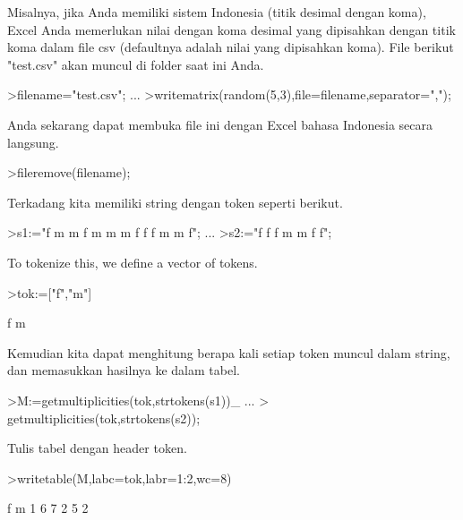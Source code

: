 \documentclass[a4paper,10pt]{article}
\begin{document}
\begin{eulernotebook}
\begin{eulercomment}
\begin{eulercomment}
\begin{eulercomment}
Misalnya, jika Anda memiliki sistem Indonesia (titik desimal dengan
koma), Excel Anda memerlukan nilai dengan koma desimal yang dipisahkan
dengan titik koma dalam file csv (defaultnya adalah nilai yang
dipisahkan koma). File berikut "test.csv" akan muncul di folder saat
ini Anda.
\end{eulercomment}
\begin{eulerprompt}
>filename="test.csv"; ...
>writematrix(random(5,3),file=filename,separator=",");
\end{eulerprompt}
\begin{eulercomment}
Anda sekarang dapat membuka file ini dengan Excel bahasa Indonesia
secara langsung.
\end{eulercomment}
\begin{eulerprompt}
>fileremove(filename);
\end{eulerprompt}
\begin{eulercomment}
Terkadang kita memiliki string dengan token seperti berikut.
\end{eulercomment}
\begin{eulerprompt}
>s1:="f m m f m m m f f f m m f";  ...
>s2:="f f f m m f f";
\end{eulerprompt}
\begin{eulercomment}
To tokenize this, we define a vector of tokens.
\end{eulercomment}
\begin{eulerprompt}
>tok:=["f","m"]
\end{eulerprompt}
\begin{euleroutput}
  f
  m
\end{euleroutput}
\begin{eulercomment}
Kemudian kita dapat menghitung berapa kali setiap token muncul dalam
string, dan memasukkan hasilnya ke dalam tabel.
\end{eulercomment}
\begin{eulerprompt}
>M:=getmultiplicities(tok,strtokens(s1))_ ...
>  getmultiplicities(tok,strtokens(s2));
\end{eulerprompt}
\begin{eulercomment}
Tulis tabel dengan header token.
\end{eulercomment}
\begin{eulerprompt}
>writetable(M,labc=tok,labr=1:2,wc=8)
\end{eulerprompt}
\begin{euleroutput}
                 f       m
         1       6       7
         2       5       2
\end{euleroutput}

\end{eulercomment}
\end{eulercomment}
\end{eulernotebook}
\end{document}
